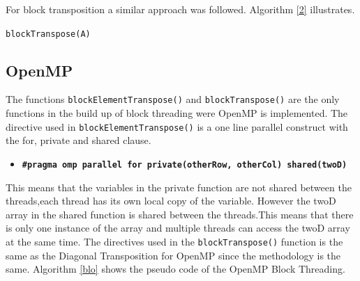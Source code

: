 \documentclass[conference]{IEEEtran}
\begin{document}
For block transposition a similar approach was followed. Algorithm \ref{2} illustrates.


\begin{algorithm}[h!]




\caption{\texttt{blockTranspose(A)}}
\label{2}
\end{algorithm}

\subsection{OpenMP}
The functions  \texttt{blockElementTranspose()} and \texttt{blockTranspose()} are the only functions in the build up of block threading were OpenMP is implemented. The directive used in \texttt{blockElementTranspose()} is a one line parallel construct with the for, private and shared clause.
\begin{itemize}
    \item \texttt{\textbf{#pragma omp parallel for private(otherRow, otherCol) shared(twoD)}}
\end{itemize}

This means that the variables in the private function are not shared between the threads,each thread has its own local copy of the variable. However the twoD array in the shared function is shared between the threads.This means that there is only one instance of the array and multiple threads can access the twoD array at the same time. The directives used in the \texttt{blockTranspose()} function is the same as the Diagonal Transposition for OpenMP since the methodology is the same. Algorithm \ref{blo} shows the pseudo code of the OpenMP Block Threading.
\end{document}
